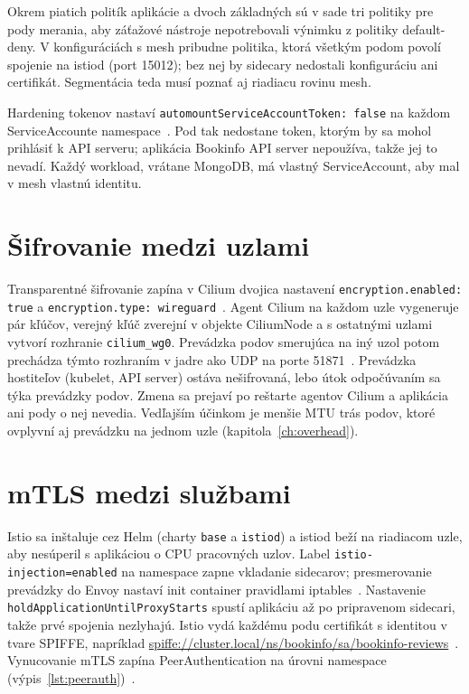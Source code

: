 Okrem piatich politík aplikácie a dvoch základných sú v sade tri politiky pre pody merania, aby záťažové nástroje nepotrebovali výnimku z politiky default-deny. V konfiguráciách s mesh pribudne politika, ktorá všetkým podom povolí spojenie na istiod (port 15012); bez nej by sidecary nedostali konfiguráciu ani certifikát. Segmentácia teda musí poznať aj riadiacu rovinu mesh.

Hardening tokenov nastaví \texttt{automountServiceAccountToken: false} na každom ServiceAccounte namespace~\cite{k8s-serviceaccounts}. Pod tak nedostane token, ktorým by sa mohol prihlásiť k API serveru; aplikácia Bookinfo API server nepoužíva, takže jej to nevadí. Každý workload, vrátane MongoDB, má vlastný ServiceAccount, aby mal v mesh vlastnú identitu.

\section{Šifrovanie medzi uzlami}

Transparentné šifrovanie zapína v Cilium dvojica nastavení \texttt{encryption.enabled: true} a \texttt{encryption.type: wireguard}~\cite{cilium-wireguard}. Agent Cilium na každom uzle vygeneruje pár kľúčov, verejný kľúč zverejní v objekte CiliumNode a s ostatnými uzlami vytvorí rozhranie \texttt{cilium\_wg0}. Prevádzka podov smerujúca na iný uzol potom prechádza týmto rozhraním v jadre ako UDP na porte 51871~\cite{donenfeld2017wireguard}. Prevádzka hostiteľov (kubelet, API server) ostáva nešifrovaná, lebo útok odpočúvaním sa týka prevádzky podov. Zmena sa prejaví po reštarte agentov Cilium a aplikácia ani pody o nej nevedia. Vedľajším účinkom je menšie MTU trás podov, ktoré ovplyvní aj prevádzku na jednom uzle (kapitola~\ref{ch:overhead}).

\section{mTLS medzi službami}

Istio sa inštaluje cez Helm (charty \texttt{base} a \texttt{istiod}) a istiod beží na riadiacom uzle, aby nesúperil s aplikáciou o CPU pracovných uzlov. Label \texttt{istio-injection=enabled} na namespace zapne vkladanie sidecarov; presmerovanie prevádzky do Envoy nastaví init container pravidlami iptables~\cite{istio-security}. Nastavenie \texttt{holdApplicationUntilProxyStarts} spustí aplikáciu až po pripravenom sidecari, takže prvé spojenia nezlyhajú. Istio vydá každému podu certifikát s identitou v tvare SPIFFE, napríklad \url{spiffe://cluster.local/ns/bookinfo/sa/bookinfo-reviews}~\cite{spiffe-id}. Vynucovanie mTLS zapína PeerAuthentication na úrovni namespace (výpis~\ref{lst:peerauth})~\cite{istio-peerauthentication}.

